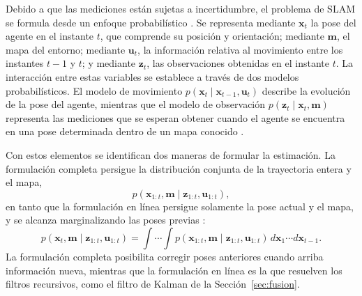 Debido a que las mediciones están sujetas a incertidumbre, el problema de SLAM se formula desde un enfoque probabilístico \cite{thrun2005probabilistic}.
Se representa mediante $\mathbf{x}_t$ la pose del agente en el instante $t$, que comprende su posición y orientación; mediante $\mathbf{m}$, el mapa del entorno; mediante $\mathbf{u}_t$, la información relativa al movimiento entre los instantes $t-1$ y $t$; y mediante $\mathbf{z}_t$, las observaciones obtenidas en el instante $t$.
La interacción entre estas variables se establece a través de dos modelos probabilísticos.
El modelo de movimiento $p(\mathbf{x}_t \mid \mathbf{x}_{t-1}, \mathbf{u}_t)$ describe la evolución de la pose del agente, mientras que el modelo de observación $p(\mathbf{z}_t \mid \mathbf{x}_t, \mathbf{m})$ representa las mediciones que se esperan obtener cuando el agente se encuentra en una pose determinada dentro de un mapa conocido \cite{thrun2005probabilistic}.

Con estos elementos se identifican dos maneras de formular la estimación.
La formulación completa persigue la distribución conjunta de la trayectoria entera y el mapa,
\begin{equation}
p(\mathbf{x}_{1:t}, \mathbf{m} \mid \mathbf{z}_{1:t}, \mathbf{u}_{1:t}),
\label{eq:slam-completo}
\end{equation}
en tanto que la formulación en línea persigue solamente la pose actual y el mapa, y se alcanza marginalizando las poses previas \cite{thrun2005probabilistic}:
\begin{equation}
p(\mathbf{x}_{t}, \mathbf{m} \mid \mathbf{z}_{1:t}, \mathbf{u}_{1:t}) = \int \!\cdots\! \int p(\mathbf{x}_{1:t}, \mathbf{m} \mid \mathbf{z}_{1:t}, \mathbf{u}_{1:t}) \, d\mathbf{x}_{1} \cdots d\mathbf{x}_{t-1}.
\label{eq:slam-linea}
\end{equation}
La formulación completa posibilita corregir poses anteriores cuando arriba información nueva, mientras que la formulación en línea es la que resuelven los filtros recursivos, como el filtro de Kalman de la Sección~\ref{sec:fusion}.

